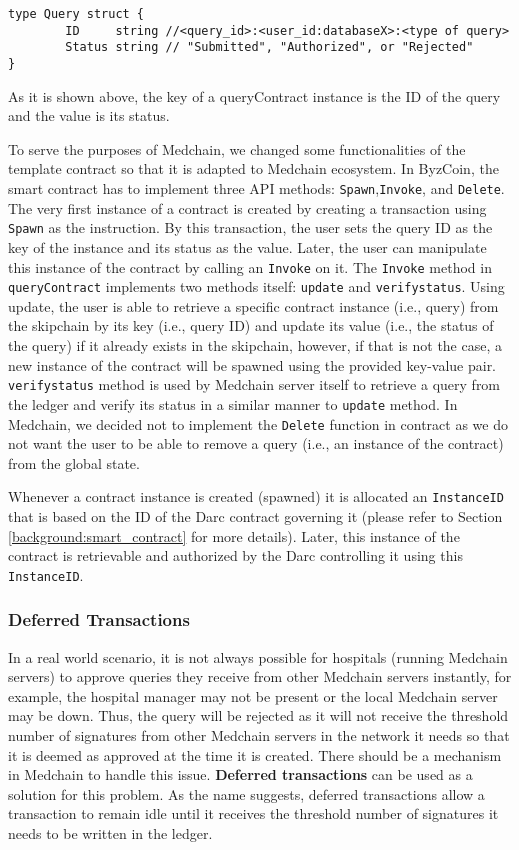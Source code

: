 \begin{verbatim}
type Query struct {
	    ID     string //<query_id>:<user_id:databaseX>:<type of query>
	    Status string // "Submitted", "Authorized", or "Rejected"
} 
\end{verbatim}

As it is shown above, the key of a queryContract instance is the ID of the query and the value is its status.  

To serve the purposes of Medchain, we changed some functionalities of the template contract so that it is adapted to Medchain ecosystem. In ByzCoin, the smart contract has to implement three API methods: \texttt{Spawn},\texttt{Invoke}, and \texttt{Delete}. The very first instance of a contract is created by creating a transaction using \texttt{Spawn} as the instruction. By this transaction, the user sets the query ID as the key of the instance and its status as the value. Later, the user can manipulate this instance of the contract by calling an \texttt{Invoke} on it. The \texttt{Invoke} method in \texttt{queryContract} implements two methods itself: \texttt{update} and \texttt{verifystatus}. Using update, the user is able to retrieve a specific contract instance (i.e., query) from the skipchain by its key (i.e., query ID) and update its value (i.e., the status of the query) if it already exists in the skipchain, however, if that is not the case, a new instance of the contract will be spawned using the provided key-value pair. \texttt{verifystatus} method is used by Medchain server itself to retrieve a query from the ledger and verify its status in a similar manner to \texttt{update} method. In Medchain, we decided not to implement the \texttt{Delete} function in contract as we do not want the user to be able to remove a query (i.e., an instance of the contract) from the global state. 

Whenever a contract instance is created (spawned) it is allocated an \texttt{InstanceID} that is based on the ID of the Darc contract governing it (please refer to Section \ref{background:smart_contract} for more details). Later, this instance of the contract is retrievable and authorized by the Darc controlling it using this \texttt{InstanceID}. 

\subsubsection{Deferred Transactions} \label{impl:deferred_tx}
In a real world scenario, it is not always possible for hospitals (running Medchain servers) to approve queries they receive from other Medchain servers instantly, for example, the hospital manager may not be present or the local Medchain server may be down. Thus, the query will be rejected as it will not receive the threshold number of signatures from other Medchain servers in the network it needs so that it is deemed as approved at the time it is created. There should be a mechanism in Medchain to handle this issue. \textbf{Deferred transactions} can be used as a solution for this problem. As the name suggests, deferred transactions allow a transaction to remain idle until it receives the threshold number of signatures it needs to be written in the ledger.  

